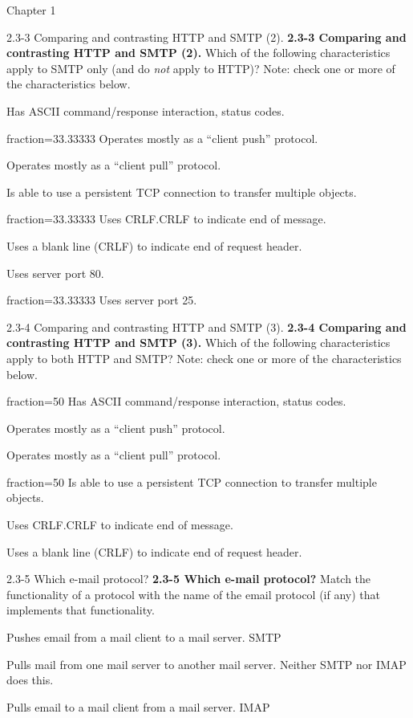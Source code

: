\documentclass[a4paper]{article}
\begin{document}
\begin{quiz}{Chapter 1}
\begin{multi}[points=1,shuffle,multiple]{2.3-3 Comparing and contrasting HTTP and SMTP (2).}
\textbf{2.3-3 Comparing and contrasting HTTP and SMTP (2).} Which of the following characteristics apply to SMTP only (and do \emph{not} apply to HTTP)?  Note: check one or more of the characteristics below.
\item Has ASCII command/response interaction, status codes.
\item[fraction=33.33333] Operates mostly as a “client push” protocol.
\item Operates mostly as a “client pull” protocol.
\item Is able to use a persistent TCP connection to transfer multiple objects.
\item[fraction=33.33333] Uses CRLF.CRLF to indicate end of message.
\item Uses a blank line (CRLF) to indicate end of request header.
\item Uses server port 80.
\item[fraction=33.33333] Uses server port 25.
\end{multi}

\begin{multi}[points=1,shuffle,multiple]{2.3-4 Comparing and contrasting HTTP and SMTP (3).}
\textbf{2.3-4 Comparing and contrasting HTTP and SMTP (3).} Which of the following characteristics apply to both HTTP and SMTP? Note: check one or more of the characteristics below.
\item[fraction=50] Has ASCII command/response interaction, status codes.
\item Operates mostly as a “client push” protocol.
\item Operates mostly as a “client pull” protocol.
\item[fraction=50] Is able to use a persistent TCP connection to transfer multiple objects.
\item Uses CRLF.CRLF to indicate end of message.
\item Uses a blank line (CRLF) to indicate end of request header.
\end{multi}

\begin{matching}[points=1,shuffle]{2.3-5 Which e-mail protocol?}
\textbf{2.3-5 Which e-mail protocol?}  Match the functionality of a protocol with the name of the email protocol (if any) that implements that functionality.
\item Pushes email from a mail client to a mail server. \answer SMTP
\item Pulls mail from one mail server to another mail server. \answer Neither SMTP nor IMAP does this.
\item Pulls email to a mail client from a mail server. \answer IMAP
\end{matching}


\end{quiz}
\end{document}
